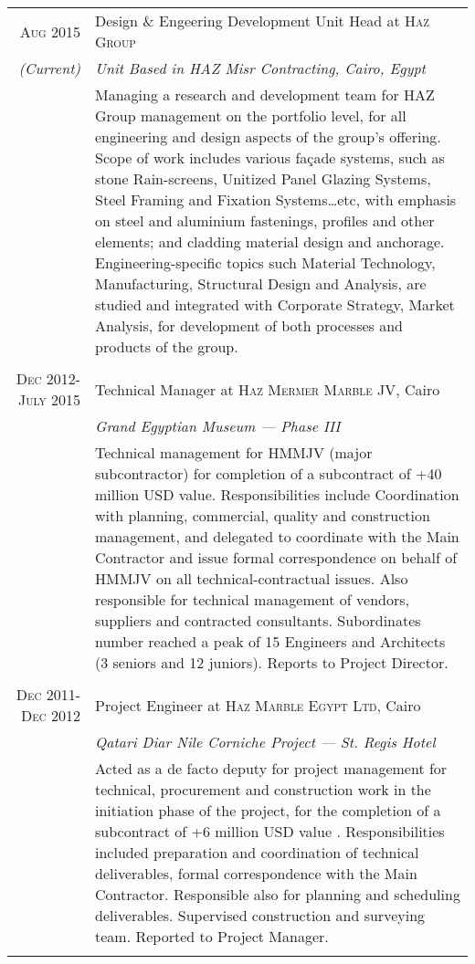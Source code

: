 \documentclass[a4paper,11pt]{article} %
\begin{document}
\begin{tabular}{r|p{11cm}}

\textsc{Aug 2015} & Design \& Engeering Development Unit Head at \textsc{Haz Group}\\
\emph{(Current)} & \emph{Unit Based in HAZ Misr Contracting, Cairo, Egypt} \\
& \footnotesize{Managing a research and development team for HAZ Group management on the portfolio level, for all engineering and design aspects of the group's offering. Scope of work includes various fa\c{c}ade systems, such as stone Rain-screens, Unitized Panel Glazing Systems, Steel Framing and Fixation Systems\ldots etc, with emphasis on steel and aluminium fastenings, profiles and other elements; and cladding material design and anchorage. Engineering-specific topics such Material Technology, Manufacturing, Structural Design and Analysis, are studied and integrated with Corporate Strategy, Market Analysis, for development of both processes and products of the group.}\\
\multicolumn{2}{c}{} \\



\textsc{Dec 2012-July 2015} & Technical Manager at \textsc{Haz Mermer Marble JV}, Cairo\\
& \emph{Grand Egyptian Museum --- Phase III}\\ 
& \footnotesize{Technical management for HMMJV (major subcontractor) for completion of a subcontract of +40 million USD value. Responsibilities include Coordination with planning, commercial, quality and construction management, and delegated to coordinate with the Main Contractor and issue formal correspondence on behalf of HMMJV on all technical-contractual issues. Also responsible for technical management of vendors, suppliers and contracted consultants. Subordinates number reached a peak of 15 Engineers and Architects (3 seniors and 12 juniors). Reports to Project Director.}\\
\multicolumn{2}{c}{} \\


\textsc{Dec 2011-Dec 2012} & Project Engineer at \textsc{Haz Marble Egypt Ltd}, Cairo \\
& \emph{Qatari Diar Nile Corniche Project --- St. Regis Hotel} \\
& \footnotesize{Acted as a de facto deputy for project management for technical, procurement and construction work in the initiation phase of the project, for the completion of a subcontract of +6 million USD value . Responsibilities included preparation and coordination of technical deliverables, formal correspondence with the Main Contractor. Responsible also for planning and scheduling deliverables. Supervised construction and surveying team. Reported to Project Manager.}\\
\multicolumn{2}{c}{} \\


\end{tabular}
\end{document}
